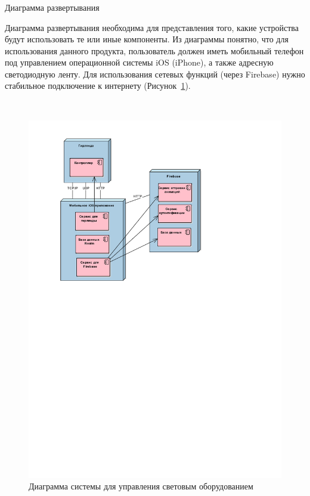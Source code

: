\subsubsection{} Диаграмма развертывания
\label{sec:develop:umlDiagrams:deployment}

Диаграмма развертывания необходима для представления того, какие устройства будут использовать те или иные компоненты. Из диаграммы понятно, что для использования данного продукта, пользователь должен иметь мобильный телефон под управлением операционной системы iOS (iPhone), а также адресную светодиодную ленту. Для использования сетевых функций (через Firebase) нужно стабильное подключение к интернету (Рисунок~\ref{fig:develop:umlDiagrams:deployment}).

~
\begin{figure}[H]
\centering
	\includegraphics[scale=0.8]{figures/diagrams/uml_deployment.pdf}
	\caption{Диаграмма системы для управления световым оборудованием}
	\label{fig:develop:umlDiagrams:deployment}
\end{figure}

